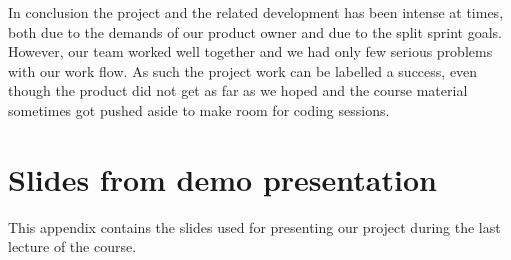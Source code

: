 \documentclass[a4paper,11pt]{article}
\begin{document}
In conclusion the project and the related development has been intense at times,
both due to the demands of our product owner and due to the split sprint goals.
However, our team worked well together and we had only few serious problems with
our work flow. As such the project work can be labelled a success, even though
the product did not get as far as we hoped and the course material sometimes got
pushed aside to make room for coding sessions.

\newpage
\appendix
\section{Slides from demo presentation}
\label{sec:presentation_slides}
This appendix contains the slides used for presenting our project during the
last lecture of the course.

\end{document}
